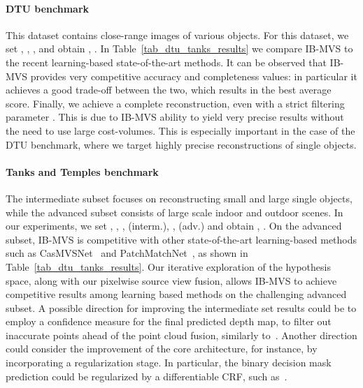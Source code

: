 \documentclass{bmvc2k}
\begin{document}
\paragraph{DTU benchmark~\cite{dtu}}
This dataset contains close-range images of various objects.
For this dataset, we set , , ,  and obtain , .
In Table~\ref{tab_dtu_tanks_results} we compare IB-MVS to the recent learning-based state-of-the-art methods.
It can be observed that IB-MVS provides very competitive accuracy and completeness values: in particular it achieves a good trade-off between the two, which results in the best average score.
Finally, we achieve a complete reconstruction, even with a strict filtering parameter .
This is due to IB-MVS ability to yield very precise results without the need to use large cost-volumes. This is especially important in the case of the DTU benchmark, where we target highly precise reconstructions of single objects.
\paragraph{Tanks and Temples benchmark~\cite{tanksandtemples}}
The intermediate subset focuses on reconstructing small and large single objects, while the advanced subset consists of large scale indoor and outdoor scenes.
In our experiments, we set , , ,  (interm.), ,  (adv.) and obtain , .
On the advanced subset, IB-MVS is competitive with other state-of-the-art learning-based methods such as CasMVSNet~\cite{casmvs} and PatchMatchNet~\cite{patchmatchnet}, as shown in Table~\ref{tab_dtu_tanks_results}.
Our iterative exploration of the hypothesis space, along with our pixelwise source view fusion, allows IB-MVS to achieve competitive results among learning based methods on the challenging advanced subset.
A possible direction for improving the intermediate set results could be to employ a confidence measure for the final predicted depth map, to filter out inaccurate points ahead of the point cloud fusion, similarly to~\cite{deepcmvs}.
Another direction could consider the improvement of the core architecture, for instance, by incorporating a regularization stage. In particular, the binary decision mask prediction could be regularized by a differentiable CRF, such as~\cite{bp_mvsnet}.
\end{document}

